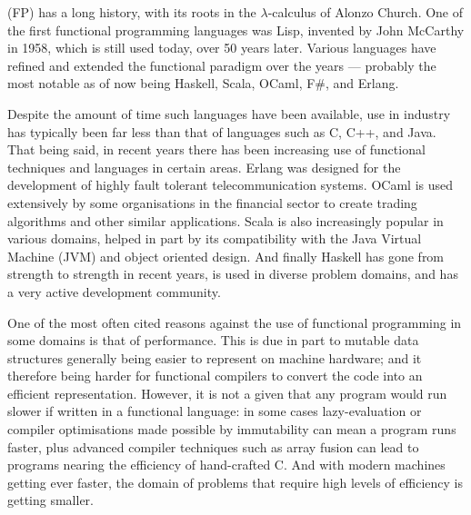  (FP) has a long history, with its roots in the $\lambda$-calculus of Alonzo Church. One of the first functional programming languages was Lisp, invented by John McCarthy in 1958, which is still used today, over 50 years later. Various languages have refined and extended the functional paradigm over the years --- probably the most notable as of now being Haskell, Scala, OCaml, F\#, and Erlang.

Despite the amount of time such languages have been available, use in industry has typically been far less than that of languages such as C, C++, and Java. That being said, in recent years there has been increasing use of functional techniques and languages in certain areas. Erlang was designed for the development of highly fault tolerant telecommunication systems.\cite[-1em]{armstrong2007history} OCaml is used extensively by some organisations in the financial sector to create trading algorithms and other similar applications. Scala is also increasingly popular in various domains, helped in part by its compatibility with the Java Virtual Machine (JVM) and object oriented design. And finally Haskell has gone from strength to strength in recent years, is used in diverse problem domains, and has a very active development community.

One of the most often cited reasons against the use of functional programming in some domains is that of performance. This is due in part to mutable data structures generally being easier to represent on machine hardware; and it therefore being harder for functional compilers to convert the code into an efficient representation. However, it is not a given that any program would run slower if written in a functional language: in some cases lazy-evaluation or compiler optimisations made possible by immutability can mean a program runs faster, plus advanced compiler techniques such as array fusion can lead to programs nearing the efficiency of hand-crafted C. And with modern machines getting ever faster, the domain of problems that require high levels of efficiency is getting smaller.

